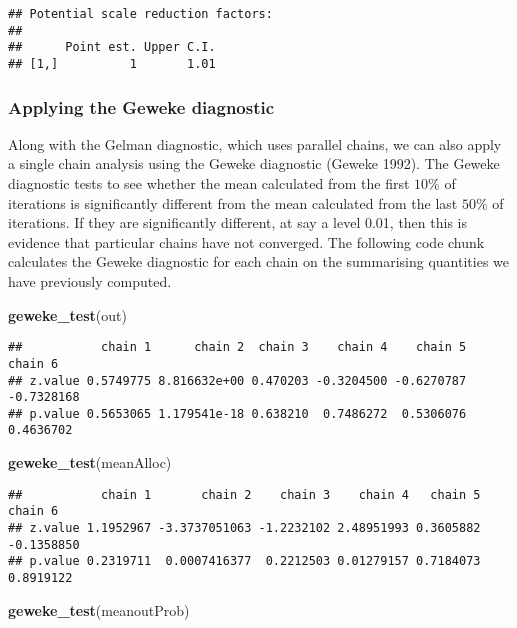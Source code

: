 \documentclass[]{article}
\newenvironment{Shaded}{\begin{snugshade}}{\end{snugshade}}
\newcommand{\KeywordTok}[1]{\textcolor[rgb]{0.13,0.29,0.53}{\textbf{{#1}}}}
\newcommand{\NormalTok}[1]{{#1}}
\begin{document}
\begin{verbatim}
## Potential scale reduction factors:
## 
##      Point est. Upper C.I.
## [1,]          1       1.01
\end{verbatim}

\subsubsection{Applying the Geweke
diagnostic}\label{applying-the-geweke-diagnostic}

Along with the Gelman diagnostic, which uses parallel chains, we can
also apply a single chain analysis using the Geweke diagnostic (Geweke
1992). The Geweke diagnostic tests to see whether the mean calculated
from the first \(10\%\) of iterations is significantly different from
the mean calculated from the last \(50\%\) of iterations. If they are
significantly different, at say a level 0.01, then this is evidence that
particular chains have not converged. The following code chunk
calculates the Geweke diagnostic for each chain on the summarising
quantities we have previously computed.

\begin{Shaded}
\begin{Highlighting}[]
\KeywordTok{geweke_test}\NormalTok{(out)}
\end{Highlighting}
\end{Shaded}

\begin{verbatim}
##           chain 1      chain 2  chain 3    chain 4    chain 5    chain 6
## z.value 0.5749775 8.816632e+00 0.470203 -0.3204500 -0.6270787 -0.7328168
## p.value 0.5653065 1.179541e-18 0.638210  0.7486272  0.5306076  0.4636702
\end{verbatim}

\begin{Shaded}
\begin{Highlighting}[]
\KeywordTok{geweke_test}\NormalTok{(meanAlloc)}
\end{Highlighting}
\end{Shaded}

\begin{verbatim}
##           chain 1       chain 2    chain 3    chain 4   chain 5    chain 6
## z.value 1.1952967 -3.3737051063 -1.2232102 2.48951993 0.3605882 -0.1358850
## p.value 0.2319711  0.0007416377  0.2212503 0.01279157 0.7184073  0.8919122
\end{verbatim}

\begin{Shaded}
\begin{Highlighting}[]
\KeywordTok{geweke_test}\NormalTok{(meanoutProb)}
\end{Highlighting}
\end{Shaded}
\end{document}
